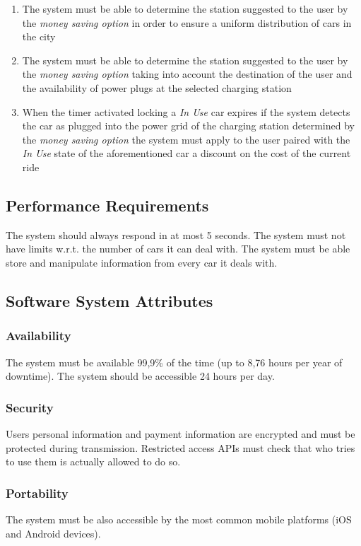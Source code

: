 \begin{description}
\begin{enumerate}[resume*]
  				\item The system must be able to determine the station suggested to the user by the
  				\emph{money saving option} in order to ensure a uniform distribution of cars in the
  				city
  				\item The system must be able to determine the station suggested to the user by the
  				\emph{money saving option} taking into account the destination of the user and
  				the availability of power plugs at the selected charging station
  				\item When the timer activated locking a \emph{In Use} car expires if the system
  				detects the car as plugged into the power grid of the charging station determined by
  				the \emph{money saving option} the system must apply to the user paired with the
  				\emph{In Use} state of the aforementioned car a discount on the cost of
  				the current ride		
   			\end{enumerate}
  	\end{description}
  	
\subsection{Performance Requirements}
The system should always respond in at most 5 seconds. The system must not have limits w.r.t. the number of cars it can deal with. The system must be able store and manipulate information from every car it deals with. 
\subsection{Software System Attributes}
	\subsubsection{Availability}
	The system must be available 99,9\% of the time (up to 8,76 hours per year of downtime). The system should be accessible 24 hours per day.
	\subsubsection{Security}
	Users personal information and payment information are encrypted and must be protected during transmission.
	Restricted access APIs must check that who tries to use them is actually allowed to do so.
	\subsubsection{Portability}
	The system must be also accessible by the most common mobile platforms (iOS and Android devices).

